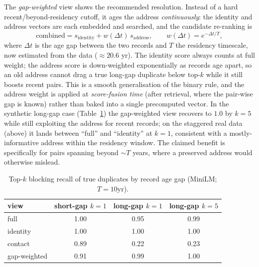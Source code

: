 \documentclass[11pt]{article}
\begin{document}
The \emph{gap-weighted} view shows the recommended resolution. Instead of a hard
recent/beyond-residency cutoff, it ages the address \emph{continuously}: the identity and
address vectors are each embedded and searched, and the candidate re-ranking is
\begin{equation}
\text{combined} = s_{\text{identity}} + w(\Delta t)\,s_{\text{address}},\qquad
w(\Delta t)=e^{-\Delta t/T},
\label{eq:gapweight}
\end{equation}
where $\Delta t$ is the age gap between the two records and $T$ the residency timescale, now
estimated from the data ($\approx20.6$ yr). The identity score always counts at full weight; the
address score is down-weighted exponentially as records age apart, so an old address cannot drag a
true long-gap duplicate below top-$k$ while it still boosts recent pairs. This is a smooth
generalisation of the binary rule, and the address weight is applied at \emph{score-fusion time}
(after retrieval, where the pair-wise gap is known) rather than baked into a single precomputed
vector. In the synthetic long-gap case (Table~\ref{tab:temporal-recall}) the gap-weighted view
recovers to $1.0$ by $k{=}5$ while still exploiting the address for recent records; on the
staggered real data (above) it lands between ``full'' and ``identity'' at $k{=}1$, consistent
with a mostly-informative address within the residency window. The claimed benefit is
specifically for pairs spanning beyond $\sim T$ years, where a preserved address would otherwise
mislead.

\begin{table}[h]
\centering
\caption{Top-$k$ blocking recall of true duplicates by record age gap (MiniLM; $T{=}10$yr).}
\label{tab:temporal-recall}
\begin{tabular}{lccc}
\toprule
view & short-gap $k{=}1$ & long-gap $k{=}1$ & long-gap $k{=}5$ \\
\midrule
full         & 1.00 & 0.95 & 0.99 \\
identity     & 1.00 & 1.00 & 1.00 \\
contact      & 0.89 & 0.22 & 0.23 \\
gap-weighted & 0.91 & 0.99 & 1.00 \\
\bottomrule
\end{tabular}
\end{table}
\end{document}
